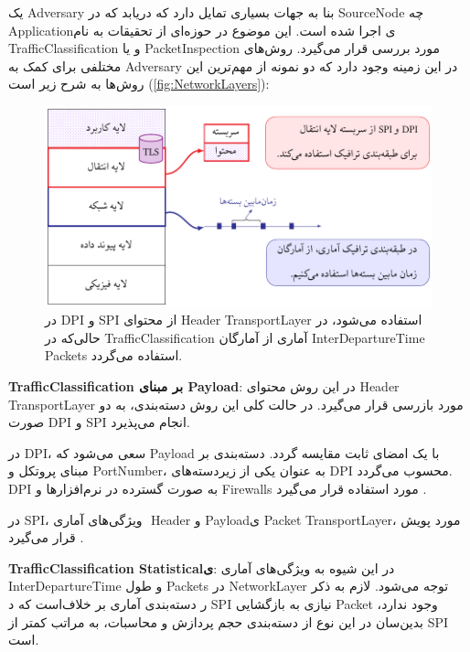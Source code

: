 یک
\gls{Adversary}
بنا به جهات بسیاری تمایل دارد که دریابد که در 
\gls{SourceNode} چه \gls{Application}ی
اجرا شده است. این موضوع در حوزه‌ای از تحقیقات به نام 
\gls{TrafficClassification}‌ و یا \gls{PacketInspection}
مورد بررسی قرار می‌گیرد. روش‌های مختلفی برای کمک به \gls{Adversary} در این زمینه وجود دارد که دو نمونه از مهم‌ترین این روش‌ها به شرح زیر است
\cite{Valenti2013Reviewing} (\autoref{fig:NetworkLayers}):
\begin{figure}
\includegraphics[width=0.75\linewidth]{Pic/NetworkLayers/mainFig}
\caption{
در
\gls*{DPI} و \gls*{SPI} از محتوای \gls*{Header} \gls*{TransportLayer}
استفاده می‌شود، در حالی‌که در 
\gls*{TrafficClassification} آماری
 از آمارگان
\gls*{InterDepartureTime} \glspl*{Packet}
استفاده می‌گردد. 
}
\label{fig:NetworkLayers}
\end{figure}
\begin{itemize}
\hand \textbf{\gls{TrafficClassification}
بر مبنای ‎\gls{Payload}}‎: در این روش محتوای 
\gls{Header} \gls{TransportLayer}
 مورد بازرسی قرار می‌گیرد. در حالت کلی این روش دسته‌بندی، به دو صورت ‎\gls{DPI}‎‌ و ‎\gls{SPI}‎ انجام می‌پذیرد.
\begin{itemize}
\sci
 در ‎\gls{DPI}‎، سعی می‌شود که ‎\gls{Payload}‎ با یک امضای ثابت مقایسه گردد. دسته‌بندی بر مبنای پروتکل و ‎‎\gls{PortNumber}‎، به عنوان یکی از زیردسته‌های ‎\gls{DPI}‎ ‌محسوب می‌گردد. 
\gls{DPI}
به صورت گسترده در نرم‌افزارها و ‎\glspl{Firewall}‎ مورد استفاده قرار می‌گیرد
\cite{AbuHmed2008Survey}.
\sci

در ‎\gls{SPI}‎، ویژگی‌های آماری ‎
\gls{Header} و \gls{Payload}ی \gls{Packet} \gls{TransportLayer}،
مورد پویش قرار می‌گیرد
\cite{finamore2010kiss}.
\end{itemize}
\hand \textbf{\gls{TrafficClassification} ‎\gls{Statistical}ی}‎:
 در این شیوه به ویژگی‌های آماری 
\gls{InterDepartureTime} و طول \glspl{Packet} در \gls{NetworkLayer}
توجه می‌شود. لازم به ذکر است که د‎ر دسته‌بندی آماری بر خلاف \gls{SPI} نیازی به بازگشایی
\gls{Packet}
وجود ندارد، بدین‌سان در این نوع از دسته‌بندی‌ حجم پردازش و محاسبات، به مراتب کمتر از 
\gls{SPI}
است. 
\end{itemize}
